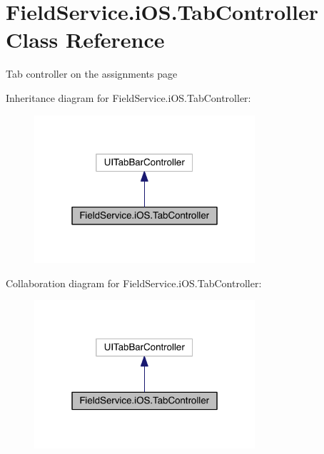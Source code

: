 \hypertarget{class_field_service_1_1i_o_s_1_1_tab_controller}{\section{Field\+Service.\+i\+O\+S.\+Tab\+Controller Class Reference}
\label{class_field_service_1_1i_o_s_1_1_tab_controller}
}


Tab controller on the assignments page  




Inheritance diagram for Field\+Service.\+i\+O\+S.\+Tab\+Controller\+:
\nopagebreak
\begin{figure}[H]
\begin{center}
\leavevmode
\includegraphics[width=232pt]{class_field_service_1_1i_o_s_1_1_tab_controller__inherit__graph}
\end{center}
\end{figure}


Collaboration diagram for Field\+Service.\+i\+O\+S.\+Tab\+Controller\+:
\nopagebreak
\begin{figure}[H]
\begin{center}
\leavevmode
\includegraphics[width=232pt]{class_field_service_1_1i_o_s_1_1_tab_controller__coll__graph}
\end{center}
\end{figure}
